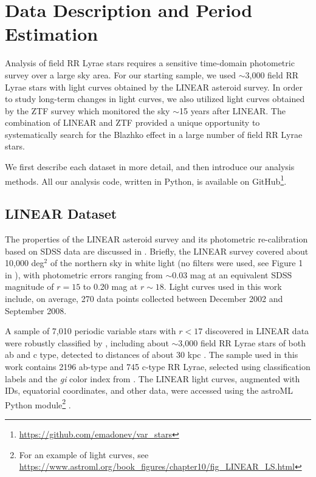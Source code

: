
\phantom{There is some latex bug somewhere and this dummy call is needed to force it to make pdf...}


\section{Data Description and Period Estimation \label{sec:data}}

Analysis of field RR Lyrae stars requires a sensitive time-domain photometric survey over a large sky area.
For our starting sample, we used $\sim$3,000 field RR Lyrae stars with light curves obtained by the LINEAR
asteroid survey. In order to study long-term changes in light curves, we also utilized light curves obtained
by the ZTF survey which monitored the sky $\sim$15 years after LINEAR. The combination of LINEAR and
ZTF provided a unique opportunity to systematically search for the Blazhko effect in a large number of
field RR Lyrae stars.


We first describe each dataset in more detail, and then introduce our analysis methods. All our analysis
code, written in Python, is available on GitHub\footnote{\url{https://github.com/emadonev/var_stars}}.  
 


\subsection{LINEAR Dataset}

The properties of the LINEAR asteroid survey and its photometric re-calibration based on SDSS data are discussed
in \cite{2011AJ....142..190S}. Briefly, the LINEAR survey covered about 10,000 deg$^2$ of the northern sky in white
light (no filters were used, see Figure 1 in \citealt{2011AJ....142..190S}), with photometric errors ranging from $\sim$0.03
mag at an equivalent SDSS magnitude of $r=15$ to 0.20 mag at $r\sim18$. Light curves used in this work include,
on average, 270 data points collected between December 2002 and September 2008.
 
A sample of 7,010 periodic variable stars with $r<17$ discovered in LINEAR data were robustly classified by
\cite{2013AJ....146..101P}, including
about $\sim$3,000 field RR Lyrae stars of both ab and c type, detected to distances of about 30 kpc \citep{2013AJ....146...21S}.
The sample used in this work contains 2196 ab-type and 745 c-type RR Lyrae, selected using classification labels and the {\it gi}
color index from \cite{2013AJ....146..101P}.
The LINEAR light curves, augmented with IDs, equatorial coordinates, and other data, were accessed using the astroML Python
module\footnote{For an example of light curves, see \url{https://www.astroml.org/book_figures/chapter10/fig_LINEAR_LS.html}}
\citep{2012cidu.conf...47V}. 


